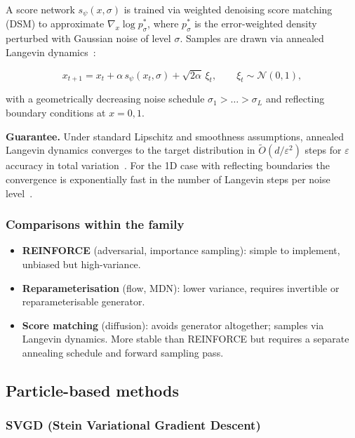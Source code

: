 \documentclass[11pt,a4paper]{article}
\begin{document}
A score network $s_\psi(x,\sigma)$ is trained via weighted denoising
score matching (DSM) to approximate
$\nabla_x\log p_\sigma^*$, where $p_\sigma^*$ is the error-weighted
density perturbed with Gaussian noise of level $\sigma$.
Samples are drawn via annealed Langevin dynamics~\citep{song2019generative}:

\begin{equation}
  x_{t+1} = x_t + \alpha\, s_\psi(x_t,\sigma) +
            \sqrt{2\alpha}\,\xi_t,\qquad \xi_t\sim\mathcal{N}(0,1),
\end{equation}

with a geometrically decreasing noise schedule $\sigma_1>\dots>\sigma_L$
and reflecting boundary conditions at $x=0,1$.

\textbf{Guarantee.}
Under standard Lipschitz and smoothness assumptions, annealed Langevin
dynamics converges to the target distribution in
$\widetilde{O}(d/\varepsilon^2)$ steps for $\varepsilon$ accuracy in
total variation~\citep{song2019generative,song2020score}.  For the 1D
case with reflecting boundaries the convergence is exponentially fast
in the number of Langevin steps per noise level~\citep{bubeck2018sampling}.

\subsubsection{Comparisons within the family}

\begin{itemize}
  \item \textbf{REINFORCE} (adversarial, importance sampling):
        simple to implement, unbiased but high-variance.
  \item \textbf{Reparameterisation} (flow, MDN):
        lower variance, requires invertible or reparameterisable
        generator.
  \item \textbf{Score matching} (diffusion):
        avoids generator altogether; samples via Langevin dynamics.
        More stable than REINFORCE but requires a separate annealing
        schedule and forward sampling pass.
\end{itemize}

\subsection{Particle-based methods}
\label{sec:svgd}

\subsubsection{SVGD (Stein Variational Gradient Descent)}
\label{sec:svgd-detail}
\end{document}
